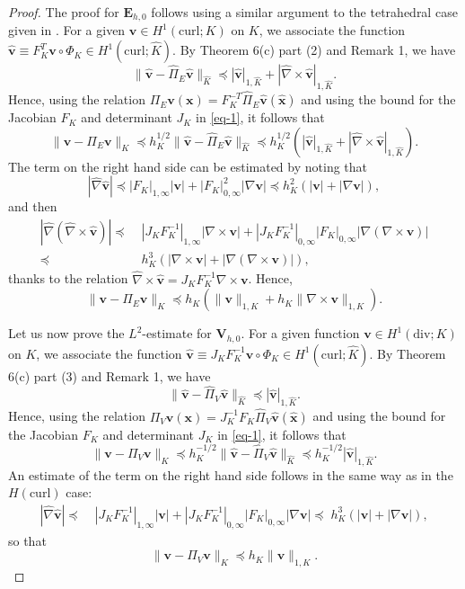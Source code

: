 \documentclass[twoside,reqno,final]{amsart}
\renewcommand{\b}[1]{{\boldsymbol{#1}}}
\newcommand{\grads}{{\nabla}}
\newcommand{\pol}{\mathbb{P}}
\begin{document}
\begin{proof}
The proof for $\b E_{h,0}$ follows using a similar argument to the tetrahedral case
given in \cite[Theorem 5.41]{Monk03}.
For a given $\b v\in H^1(\mathrm{curl};K)$ on $K$, we associate the function 
 $\widehat{\b v}\equiv F_K^{T}\b v\circ \Phi_K \in H^1(\mathrm{curl};\widehat K)$.
By Theorem 6(c) part (2) and Remark 1, we have
\[
 \|\widehat {\b v}-\widehat {\b \varPi}_E\widehat{\b  v}\|_{\widehat K}\preceq 
  |\widehat{\b v}|_{1, \widehat K}+|\widehat{\nabla}\times\widehat{\b v}|_{1, \widehat K}.
\]
 Hence, using the relation $\b\varPi_E \b v(\b x) = F_K^{-T}\widehat {\b \varPi}_E \widehat{\b v}(\widehat{\b x})$ and using the bound 
for the Jacobian $F_K$ and determinant $J_K$ in \eqref{eq-1}, it follows that 
\[
\|\b v- \b\varPi_E \b v\|_{K}\preceq h_K^{1/2} 
\|\widehat{\b v}- \widehat{\b \varPi}_E\widehat{\b v}\|_{\widehat K}\preceq h_K^{1/2} 
(|\widehat{\b v}|_{1, \widehat K}+|\widehat{\nabla}\times\widehat{\b v}|_{1, \widehat K}). 
\]
The term on the right hand side can be estimated by noting that  
\[
 |\widehat{\nabla}\widehat{\b v}|   \preceq 
  |F_K|_{1,\infty} |\b v|+|F_K|^2_{0,\infty} |\nabla\b v|
  \preceq h_K^2(|\b v|+|\nabla\b v|),
\]
and then
\begin{align*}
  |\widehat{\nabla}(\widehat{\nabla}\times\widehat{\b v})|   \preceq&\; 
  |J_KF_K^{-1}|_{1,\infty} |\nabla\times\b v|+|J_KF_K^{-1}|_{0,\infty}|F_K|_{0,\infty} |\grads(\nabla\times\b v)|\\
  \preceq &\;h_K^3(|\nabla\times \b v|+|\nabla(\nabla\times\b v)|),
\end{align*}
thanks to the relation $\widehat{\nabla}\times\widehat{\b v} = J_KF_K^{-1}\nabla\times \b v$.
Hence,
\[
\|\b v- \b\varPi_E \b v\|_{K}\preceq
h_K(\|\b v\|_{1,K}+h_K \|\nabla \times \b v\|_{1,K}).
\]

Let us now prove the $L^2$-estimate for $\b V_{h,0}$.
For a given function $\b v\in H^1(\mathrm{div};K)$ on $K$, we associate the function 
 $\widehat{\b v}\equiv J_KF_K^{-1}\b v\circ \Phi_K \in H^1(\mathrm{curl};\widehat K)$. 
By Theorem 6(c) part (3) and Remark 1, we have
\[
 \|\widehat {\b v}-\widehat {\b \varPi}_V\widehat{\b  v}\|_{\widehat K}\preceq 
  |\widehat{\b v}|_{1, \widehat K}.
\]
 Hence, using the relation $\b\varPi_V \b v(\b x) = J_K^{-1}F_K\widehat {\b \varPi}_V \widehat{\b v}(\widehat{\b x})$ and using the bound 
for the Jacobian $F_K$ and determinant $J_K$ in \eqref{eq-1}, it follows that 
\[
\|\b v- \b\varPi_V \b v\|_{K}\preceq h_K^{-1/2} 
\|\widehat{\b v}- \widehat{\b \varPi}_V\widehat{\b v}\|_{\widehat K}\preceq h_K^{-1/2} 
|\widehat{\b v}|_{1, \widehat K}. 
\]
An estimate of the term on the right hand side follows in the same way as in the $H(\mathrm{curl})$ case:
\begin{align*}
  |\widehat{\nabla}\widehat{\b v}|   \preceq&\; 
  |J_KF_K^{-1}|_{1,\infty} |\b v|+|J_KF_K^{-1}|_{0,\infty}|F_K|_{0,\infty} |\grads \b v|
  \preceq \;h_K^3(| \b v|+|\nabla\b v|),
\end{align*}
so that
\[
\|\b v- \b\varPi_V \b v\|_{K}\preceq
h_K\|\b v\|_{1,K}.
\]



\end{proof}
\end{document}
